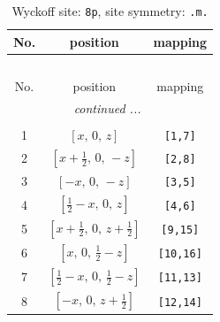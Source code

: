 \documentclass[fleqn,8pt]{jsarticle}
\begin{document}
\begin{longtable}{ccc}
\caption{Wyckoff site: {\tt 8p}, site symmetry: {\tt .m.}}
 \\
 \hline \hline
No. & position & mapping \\ \hline \endfirsthead

\multicolumn{2}{l}{\tablename\ \thetable{}} \\
 \hline \hline
No. & position & mapping \\ \hline \endhead

 \hline \hline
\multicolumn{2}{r}{\footnotesize\it continued ...} \\ \endfoot

 \hline \hline
\multicolumn{2}{r}{} \\ \endlastfoot

1 & $\left[ x,\, 0,\, z \right]$ & {\tt [1,7]} \\ \hline
2 & $\left[ x + \frac{1}{2},\, 0,\, - z \right]$ & {\tt [2,8]} \\ \hline
3 & $\left[ - x,\, 0,\, - z \right]$ & {\tt [3,5]} \\ \hline
4 & $\left[ \frac{1}{2} - x,\, 0,\, z \right]$ & {\tt [4,6]} \\ \hline
5 & $\left[ x + \frac{1}{2},\, 0,\, z + \frac{1}{2} \right]$ & {\tt [9,15]} \\ \hline
6 & $\left[ x,\, 0,\, \frac{1}{2} - z \right]$ & {\tt [10,16]} \\ \hline
7 & $\left[ \frac{1}{2} - x,\, 0,\, \frac{1}{2} - z \right]$ & {\tt [11,13]} \\ \hline
8 & $\left[ - x,\, 0,\, z + \frac{1}{2} \right]$ & {\tt [12,14]} \\
\end{longtable}
\renewcommand{\arraystretch}{1.2}
\end{document}
